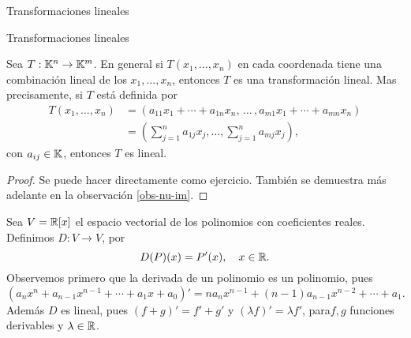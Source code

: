 \begin{chapter}{Transformaciones lineales}
\begin{section}{Transformaciones lineales}
            \begin{obs}\label{obs-tl-1.5} 	Sea $T: \mathbb K^n \to \mathbb K^m$. En  general si $T(x_1,\ldots,x_n)$ en cada coordenada tiene una combinación lineal de los $x_1,\ldots,x_n$,  entonces $T$ es una transformación lineal. Mas precisamente, si $T$ está definida por
                \begin{align*}
                T(x_1,\ldots,x_n) &= (a_{11}x_1+\cdots + a_{1n}x_n,\, \ldots\,,a_{m1}x_1+\cdots + a_{mn}x_n )\\
                &=(\sum_{j=1}^n a_{1j} x_j,\ldots,\sum_{j=1}^n a_{mj} x_j),
                \end{align*}
                con $a_{ij} \in \mathbb K$, entonces $T$  es lineal. 
            \end{obs}
            \begin{proof} Se puede hacer directamente como ejercicio. También se demuestra más adelante en la observación \ref{obs-nu-im}. 
            \begin{comment}
                Sean $(x_1,\cdots,x_n), (y_1,\cdots,y_n) \in \K^n$ y $\lambda \in \K$,  entonces
                \begin{align*}
                T(\lambda(x_1,\cdots,x_n)+ (y_1,\cdots,y_n)) &= T(\lambda x_1+y_1,\ldots,\lambda x_n+y_n) \\
                &= (\sum_{j=1}^n a_{1j} (\lambda x_j+y_j),\ldots,\sum_{j=1}^n a_{mj} (\lambda x_j+y_j)) \\
                &= (\lambda\sum_{j=1}^n a_{1j} x_j+\sum_{j=1}^n a_{1j} y_j,\ldots,\lambda\sum_{j=1}^n a_{mj} x_j+\sum_{j=1}^n a_{mj} y_j) \\
                &= \lambda(\sum_{j=1}^n a_{1j} x_j,\ldots,\sum_{j=1}^n a_{mj} x_j) +(\sum_{j=1}^n a_{1j} y_j,\ldots,\sum_{j=1}^n a_{mj} y_j) \\
                & =\lambda T(x_1,\cdots,x_n)+ T(y_1,\cdots,y_n).
                \end{align*}
            \end{comment}
            \end{proof}
        
            \begin{ejemplo*}
            Sea $V = \mathbb R[x]$ el espacio vectorial de los polinomios con coeficientes reales. Definimos $D:V \to V$, por
            $$
            D(P)(x) = P'(x),\quad x \in \mathbb R. 
            $$
            Observemos primero que la derivada de un polinomio es un polinomio, pues 
            $$
            (a_nx^n+ a_{n-1}x^{n-1}+\cdots + a_1 x + a_0)' = na_nx^{n-1}+ (n-1)a_{n-1}x^{n-2}+\cdots + a_1.
            $$
            Además  $D$  es lineal, pues $(f+g)' = f' + g'$ y $(\lambda f)' = \lambda f'$, para$f,g$ funciones derivables y $\lambda \in \mathbb R$.
            \end{ejemplo*} 
        

\end{section}
\end{chapter}
